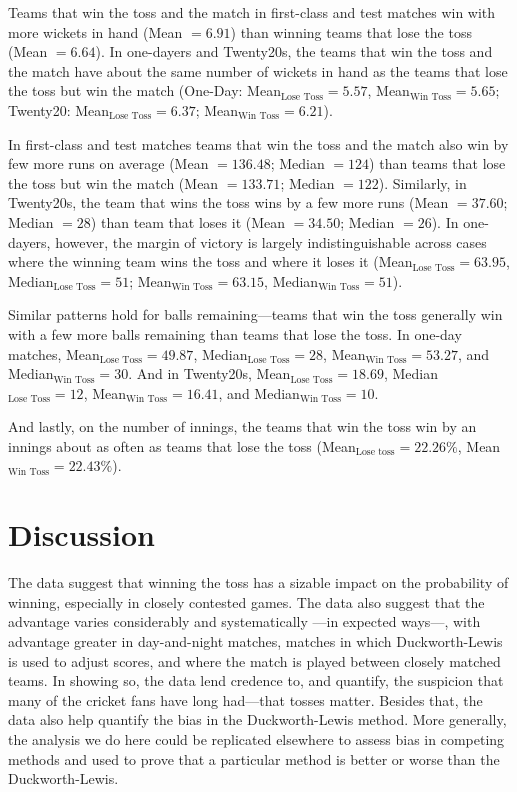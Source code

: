 \documentclass[12pt]{article}
\begin{document}
Teams that win the toss and the match in first-class and test matches win with more wickets in hand (Mean $= 6.91$) than winning teams that lose the toss (Mean $= 6.64$). In one-dayers and Twenty20s, the teams that win the toss and the match have about the same number of wickets in hand as the teams that lose the toss but win the match (One-Day: Mean$_{\text{Lose Toss}} = 5.57$, Mean$_{\text{Win Toss}} = 5.65$; Twenty20: Mean$_{\text{Lose Toss}} = 6.37$; Mean$_{\text{Win Toss}} = 6.21$). 

In first-class and test matches teams that win the toss and the match also win by few more runs on average (Mean $= 136.48$; Median $=124$) than teams that lose the toss but win the match (Mean $= 133.71$; Median $=122$). Similarly, in Twenty20s, the team that wins the toss wins by a few more runs (Mean $= 37.60$; Median $=28$) than team that loses it (Mean $= 34.50$; Median $=26$). In one-dayers, however, the margin of victory is largely indistinguishable across cases where the winning team wins the toss and where it loses it (Mean$_{\text{Lose Toss}} = 63.95$, Median$_{\text{Lose Toss}} = 51$; Mean$_{\text{Win Toss}} = 63.15$, Median$_{\text{Win Toss}} = 51$). 

Similar patterns hold for balls remaining---teams that win the toss generally win with a few more balls remaining than teams that lose the toss. In one-day matches, Mean$_{\text{Lose Toss}} = 49.87$, Median$_{\text{Lose Toss}} = 28$, Mean$_{\text{Win Toss}} = 53.27$, and Median$_{\text{Win Toss}} = 30$. And in Twenty20s, Mean$_{\text{Lose Toss}} = 18.69$, Median$_{\text{Lose Toss}} = 12$, Mean$_{\text{Win Toss}} = 16.41$, and Median$_{\text{Win Toss}} = 10$. 

And lastly, on the number of innings, the teams that win the toss win by an innings about as often as teams that lose the toss (Mean$_{\text{Lose toss}} = 22.26\%$, Mean$_{\text{Win Toss}} = 22.43\%$).

\section*{Discussion}

The data suggest that winning the toss has a sizable impact on the probability of winning, especially in closely contested games. The data also suggest that the advantage varies considerably and systematically ---in expected ways---, with advantage greater in day-and-night matches, matches in which Duckworth-Lewis is used to adjust scores, and where the match is played between closely matched teams. In showing so, the data lend credence to, and quantify, the suspicion that many of the cricket fans have long had---that tosses matter. Besides that, the data also help quantify the bias in the Duckworth-Lewis method. More generally, the analysis we do here could be replicated elsewhere to assess bias in competing methods and used to prove that a particular method is better or worse than the Duckworth-Lewis. 

\clearpage


\end{document}

